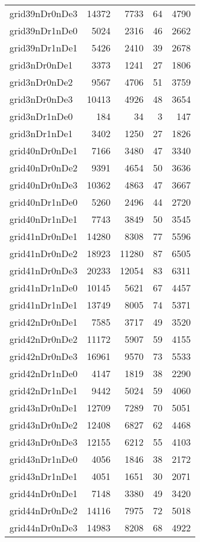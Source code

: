 \begin{longtable}{lrrrr}
grid39nDr0nDe3 & 14372 & 7733 & 64 & 4790 \\
grid39nDr1nDe0 & 5024 & 2316 & 46 & 2662 \\
grid39nDr1nDe1 & 5426 & 2410 & 39 & 2678 \\
grid3nDr0nDe1 & 3373 & 1241 & 27 & 1806 \\
grid3nDr0nDe2 & 9567 & 4706 & 51 & 3759 \\
grid3nDr0nDe3 & 10413 & 4926 & 48 & 3654 \\
grid3nDr1nDe0 & 184 & 34 & 3 & 147 \\
grid3nDr1nDe1 & 3402 & 1250 & 27 & 1826 \\
grid40nDr0nDe1 & 7166 & 3480 & 47 & 3340 \\
grid40nDr0nDe2 & 9391 & 4654 & 50 & 3636 \\
grid40nDr0nDe3 & 10362 & 4863 & 47 & 3667 \\
grid40nDr1nDe0 & 5260 & 2496 & 44 & 2720 \\
grid40nDr1nDe1 & 7743 & 3849 & 50 & 3545 \\
grid41nDr0nDe1 & 14280 & 8308 & 77 & 5596 \\
grid41nDr0nDe2 & 18923 & 11280 & 87 & 6505 \\
grid41nDr0nDe3 & 20233 & 12054 & 83 & 6311 \\
grid41nDr1nDe0 & 10145 & 5621 & 67 & 4457 \\
grid41nDr1nDe1 & 13749 & 8005 & 74 & 5371 \\
grid42nDr0nDe1 & 7585 & 3717 & 49 & 3520 \\
grid42nDr0nDe2 & 11172 & 5907 & 59 & 4155 \\
grid42nDr0nDe3 & 16961 & 9570 & 73 & 5533 \\
grid42nDr1nDe0 & 4147 & 1819 & 38 & 2290 \\
grid42nDr1nDe1 & 9442 & 5024 & 59 & 4060 \\
grid43nDr0nDe1 & 12709 & 7289 & 70 & 5051 \\
grid43nDr0nDe2 & 12408 & 6827 & 62 & 4468 \\
grid43nDr0nDe3 & 12155 & 6212 & 55 & 4103 \\
grid43nDr1nDe0 & 4056 & 1846 & 38 & 2172 \\
grid43nDr1nDe1 & 4051 & 1651 & 30 & 2071 \\
grid44nDr0nDe1 & 7148 & 3380 & 49 & 3420 \\
grid44nDr0nDe2 & 14116 & 7975 & 72 & 5018 \\
grid44nDr0nDe3 & 14983 & 8208 & 68 & 4922 \\

\end{longtable}
